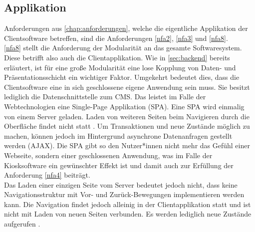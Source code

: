 \subsection{Applikation}
\label{subs:applikation}

Anforderungen aus \autoref{chap:anforderungen}, welche die eigentliche Applikation 
der Clientsoftware betreffen, sind die Anforderungen \ref{nfa2}, \ref{nfa3} und \ref{nfa8}.\\

\ref{nfa8} stellt die Anforderung der Modularität an das gesamte Softwaresystem. Diese
betrifft also auch die Clientapplikation. Wie in \autoref{sec:backend} bereits erläutert, 
ist für eine große Modularität eine lose Kopplung von Daten- und Präsentationsschicht ein
wichtiger Faktor. Umgekehrt bedeutet dies, dass die Clientsoftware eine in sich geschlossene
eigene Anwendung sein muss. Sie besitzt lediglich die Datenschnittstelle zum CMS. Das leistet im 
Falle der Webtechnologien eine Single-Page Applikation (SPA). Eine SPA wird einmalig von einem 
Server geladen. Laden von weiteren Seiten beim Navigieren durch die Oberfläche 
findet nicht statt \cite{js-definitive}. Um Transaktionen und neue Zustände möglich zu machen,
können jedoch im Hintergrund asynchrone Datenanfragen gestellt werden (AJAX). 
Die SPA gibt so den Nutzer*innen nicht mehr das Gefühl einer
Webseite, sondern einer geschlossenen Anwendung, was im Falle der Kiosksoftware ein gewünschter
Effekt ist und damit auch zur Erfüllung der Anforderung \ref{nfa4} beiträgt.\\
Das Laden einer einzigen Seite vom Server bedeutet jedoch nicht, dass keine Navigationsstruktur
mit Vor- und Zurück-Bewegungen implementieren werden kann. Die Navigation findet jedoch alleinig in 
der Clientapplikation statt und ist nicht mit Laden von neuen Seiten verbunden. Es werden lediglich
neue Zustände aufgerufen \cite{spa-manifesto}.\\

